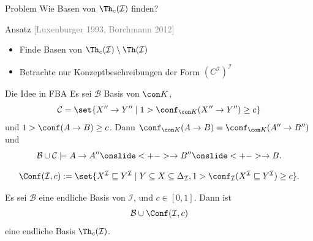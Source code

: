 \documentclass[ngerman]{beamer}
\newcommand{\pseudocite}[1]{\textcolor{gray}{[#1]}}
\begin{document}
\begin{frame}

  \onslide<+->

  \begin{block}{Problem}
    Wie Basen von $\Th_{c}(\mathcal{I})$ finden?
  \end{block}

  \onslide<+->

  \begin{block}{Ansatz \pseudocite{Luxenburger 1993, Borchmann 2012}}
    \begin{itemize}
    \item<+-> Finde Basen von $\Th_{c}(\mathcal{I}) \setminus \Th(\mathcal{I})$
    \item<+-> Betrachte nur Konzeptbeschreibungen der Form $(C^{\mathcal{I}})^{\mathcal{I}}$
    \end{itemize}
  \end{block}

  \onslide<+->
  
  \begin{block}{Die Idee in FBA}
    \onslide<+->%
    Es sei $\mathcal{B}$ Basis von $\con K$,
    \begin{equation*}
      \mathcal{C} = \set{ X'' \to Y'' \mid 1 > \conf_{\con K}(X'' \to Y'') \ge c }
    \end{equation*}
    und $1 > \conf(A \to B) \ge c$.  \onslide<+-> Dann $\conf_{\con K}(A \to B) =
    \conf_{\con K}(A'' \to B'')$ \onslide<+-> und
    \begin{equation*}
      \mathcal{B} \cup \mathcal{C} \models A \to A'' \onslide<+-> \to B'' \onslide<+->
      \to B.
    \end{equation*}
  \end{block}

\end{frame}

\begin{frame}

  \onslide<+->

  \begin{Definition}
    \begin{equation*}
      \Conf(\mathcal{I}, c) := \set{ X^{\mathcal{I}} \sqsubseteq Y^{\mathcal{I}} \mid Y
        \subseteq X \subseteq \Delta_{\mathcal{I}}, 1 > \conf_{\mathcal{I}}(
        X^{\mathcal{I}} \sqsubseteq Y^{\mathcal{I}}) \ge c}.
    \end{equation*}
  \end{Definition}

  \onslide<+->

  \begin{Satz}[\pseudocite{Borchmann 2012}]
    Es sei $\mathcal{B}$ eine endliche Basis von $\mathcal{I}$, und $c \in [0, 1]$.  Dann
    ist 
    \begin{equation*}
      \mathcal{B} \cup \Conf(\mathcal{I},c)
    \end{equation*}
    eine endliche Basis $\Th_c(\mathcal{I})$.
  \end{Satz}
  
\end{frame}
\end{document}
